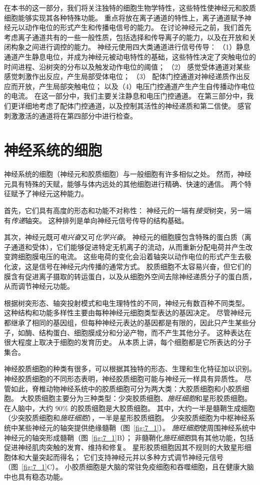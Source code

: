 在本书的这一部分，我们将关注独特的细胞生物学特性，这些特性使神经元和胶质细胞能够实现其各种特殊功能。
重点将放在离子通道的特性上，离子通道赋予神经元以动作电位的形式产生和传播电信号的能力。
在讨论神经元之前，我们首先考虑离子通道共有的一些一般性质，包括选择和传导离子的能力，以及在开放和关闭构象之间进行调控的能力。
神经元使用四大类通道进行信号传导：
（1）静息通道产生静息电位，并成为神经元被动电特性的基础，这些特性决定了突触电位的时间进程、沿树突的分布以及触发动作电位的阈值；
（2） 感觉受体通道对某些感觉刺激作出反应，产生局部受体电位；
（3） 配体门控通道对神经递质作出反应而开放，产生局部突触电位；
以及（4）电压门控通道产生产生自传播动作电位的电流。
在这一部分中，我们主要关注静息和电压门控通道。
在第三部分中，我们更详细地考虑了配体门控通道，以及控制其活性的神经递质和第二信使。
感官刺激激活的通道将在第四部分中进行检查。




\chapter{神经系统的细胞} \label{chap:chap7}

神经系统的细胞（神经元和胶质细胞）与一般细胞有许多相似之处。
然而，神经元具有特殊的天赋，能够与体内远处的其他细胞进行精确、快速的通信。
两个特征赋予了神经元这种能力。


首先，它们具有高度的形态和功能不对称性：
神经元的一端有\textit{接受}树突，另一端有\textit{传递}轴突。
这种排列是单向神经元信号传导的结构基础。


其次，神经元既可\textit{电兴奋}又可\textit{化学兴奋}。
神经元的细胞膜包含特殊的蛋白质（离子通道和受体），它们能够促进特定无机离子的流动，从而重新分配电荷并产生改变跨细胞膜电压的电流。
这些电荷的变化会沿着轴突以动作电位的形式产生去极化波，这是信号在神经元内传播的通常方式。
胶质细胞不太容易兴奋，但它们的膜含有促进离子摄取的转运蛋白，以及从细胞外空间去除神经递质分子的蛋白质，从而调节神经元功能。


根据树突形态、轴突投射模式和电生理特性的不同，神经元有数百种不同类型。
这种结构和功能多样性主要由每种神经元细胞类型表达的基因决定。
尽管神经元都继承了相同的基因组，但每种神经元表达的基因都是有限的，因此只产生某些分子，如酶、结构蛋白、细胞膜成分和分泌产物，而不产生其他分子。
这种表达在很大程度上取决于细胞的发育历史。
从本质上讲，每个细胞都是它所表达的分子集合。


神经胶质细胞的种类有很多，可以根据其独特的形态、生理和生化特征加以识别。
神经胶质细胞的不同形态表明，神经胶质细胞可能与神经元一样具有异质性。
尽管如此，脊椎动物神经系统中的胶质细胞可分为两大类：大胶质细胞和小胶质细胞。
大胶质细胞主要分为三种类型：少突胶质细胞、\textit{施旺细胞}和星形胶质细胞。
在人脑中，大约 90\% 的胶质细胞是大胶质细胞。
其中，大约一半是髓鞘生成细胞（少突胶质细胞和\textit{施旺细胞}），一半是星形胶质细胞。
少突胶质细胞为中枢神经系统中某些神经元的轴突提供绝缘髓鞘（图~\ref{fig:7_1}）。
\textit{施旺细胞}使周围神经系统中神经元的轴突形成髓鞘（图~\ref{fig:7_1}B）；
非髓鞘化\textit{施旺细胞}具有其他功能，包括促进神经肌肉突触的发育、维持和修复。
星形胶质细胞因其不规则的大致星形细胞体和大量突起而得名；
它们支持神经元并以多种方式调节神经元信号（图~\ref{fig:7_1}C）。 
小胶质细胞是大脑的常驻免疫细胞和吞噬细胞，且在健康大脑中也具有稳态功能。


